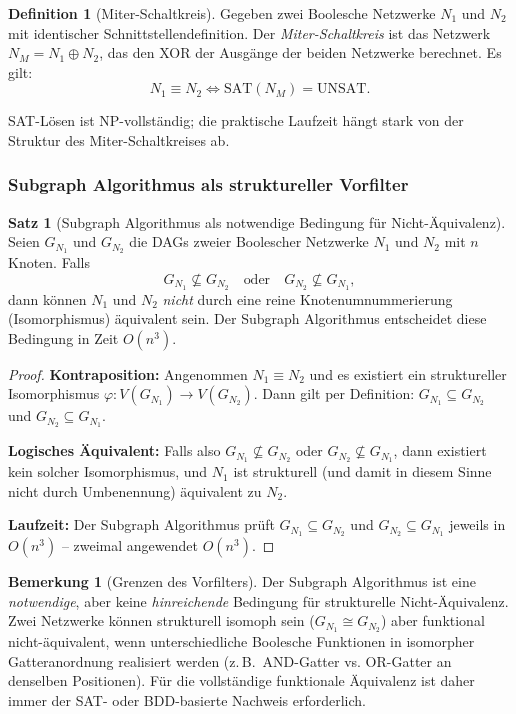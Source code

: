 ﻿\documentclass[a4paper,12pt]{article}
\theoremstyle{definition}
\newtheorem{definition}{Definition}
\newtheorem{satz}{Satz}
\newtheorem{bemerkung}{Bemerkung}
\begin{document}
\begin{definition}[Miter-Schaltkreis]\label{def:miter}
  Gegeben zwei Boolesche Netzwerke $N_1$ und $N_2$ mit identischer Schnittstellendefinition.
  Der \emph{Miter-Schaltkreis} ist das Netzwerk $N_M = N_1 \oplus N_2$, das den
  XOR der Ausgänge der beiden Netzwerke berechnet. Es gilt:
  \[
    N_1 \equiv N_2 \iff \text{SAT}(N_M) = \text{UNSAT}.
  \]
\end{definition}

SAT-Lösen ist NP-vollständig; die praktische Laufzeit hängt stark von der Struktur
des Miter-Schaltkreises ab.

\subsubsection{Subgraph Algorithmus als struktureller Vorfilter}

\begin{satz}[Subgraph Algorithmus als notwendige Bedingung für Nicht-Äquivalenz]
  \label{satz:vorfilter}
  Seien $G_{N_1}$ und $G_{N_2}$ die DAGs zweier Boolescher Netzwerke $N_1$ und $N_2$ mit
  $n$ Knoten. Falls
  \[
    G_{N_1} \not\subseteq G_{N_2} \quad \text{oder} \quad G_{N_2} \not\subseteq G_{N_1},
  \]
  dann können $N_1$ und $N_2$ \emph{nicht} durch eine reine Knotenumnummerierung
  (Isomorphismus) äquivalent sein. Der Subgraph Algorithmus entscheidet diese
  Bedingung in Zeit $O(n^3)$.
\end{satz}

\begin{proof}
  \textbf{Kontraposition:} Angenommen $N_1 \equiv N_2$ und es existiert ein struktureller
  Isomorphismus $\varphi: V(G_{N_1}) \to V(G_{N_2})$. Dann gilt per Definition:
  $G_{N_1} \subseteq G_{N_2}$ und $G_{N_2} \subseteq G_{N_1}$.

  \textbf{Logisches Äquivalent:} Falls also $G_{N_1} \not\subseteq G_{N_2}$ oder
  $G_{N_2} \not\subseteq G_{N_1}$, dann existiert kein solcher Isomorphismus, und $N_1$
  ist strukturell (und damit in diesem Sinne nicht durch Umbenennung) äquivalent zu $N_2$.

  \textbf{Laufzeit:} Der Subgraph Algorithmus prüft $G_{N_1} \subseteq G_{N_2}$ und
  $G_{N_2} \subseteq G_{N_1}$ jeweils in $O(n^3)$ -- zweimal angewendet $O(n^3)$.
\end{proof}

\begin{bemerkung}[Grenzen des Vorfilters]\label{bem:vorfiltergrenze}
  Der Subgraph Algorithmus ist eine \emph{notwendige}, aber keine \emph{hinreichende}
  Bedingung für strukturelle Nicht-Äquivalenz. Zwei Netzwerke können strukturell
  isomoph sein ($G_{N_1} \cong G_{N_2}$) aber funktional nicht-äquivalent, wenn
  unterschiedliche Boolesche Funktionen in isomorpher Gatteranordnung realisiert werden
  (z.\,B.\ AND-Gatter vs. OR-Gatter an denselben Positionen). Für die vollständige
  funktionale Äquivalenz ist daher immer der SAT- oder BDD-basierte Nachweis erforderlich.
\end{bemerkung}
\end{document}
